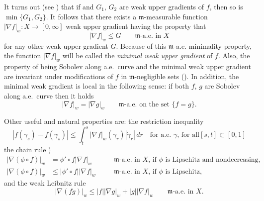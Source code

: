 \documentclass[reqno,11pt]{article}
\numberwithin{equation}{section}
\newcommand{\mm}{{\mbox{\boldmath$m$}}}
\newcommand{\weakgrad}[1]{|\nabla #1|_w}                %
\renewcommand{\mm}{\mathfrak m}
\begin{document}
It turns out (see \cite[Proposition~5.7,
Definition~5.9]{Ambrosio-Gigli-Savare11}) that if and $G_1,\,G_2$
are weak upper gradients of $f$, then so is $\min\{G_1,G_2\}$. It
follows that there exists a $\mm$-measurable function $\weakgrad
f:X\to[0,\infty]$ weak upper gradient having the property that
\[
\weakgrad f\leq G\qquad\text{$\mm$-a.e.~in $X$}
\]
for any other weak upper gradient $G$. Because of this $\mm$-a.e.
minimality property, the function $\weakgrad f$ will be called the
\emph{minimal weak upper gradient} of $f$. Also, the property of
being Sobolev along a.e.~curve and the minimal weak upper gradient
are invariant under modifications of $f$ in $\mm$-negligible sets
(\cite[Proposition~5.8]{Ambrosio-Gigli-Savare11}). In addition, the
minimal weak gradient is local in the following sense: if both
$f,\,g$ are Sobolev along a.e.~curve then it holds
\begin{equation}
\label{eq:weaklocal} \weakgrad f=\weakgrad g\qquad\text{$\mm$-a.e.
on the set $\{f=g\}$.}
\end{equation}

Other useful and natural properties are: the restriction inequality
\cite[Remark~5.6]{Ambrosio-Gigli-Savare11}
\begin{equation}
\label{eq:restrizione}
|f(\gamma_s)-f(\gamma_s)|\leq\int_t^s\weakgrad
f(\gamma_r)|\dot\gamma_r|\,dr\quad\text{for a.e.\ $\gamma$, for all
$[s,t]\subset [0,1]$}
\end{equation}
the chain rule \cite[Proposition~5.14(b)]{Ambrosio-Gigli-Savare11})
\begin{equation}
\label{eq:chainrule}
\begin{aligned}
\weakgrad{(\phi\circ f)}&=\phi'\circ f\weakgrad
f&\quad&\text{$\mm$-a.e.~in $X$, if $\phi$ is Lipschitz and nondecreasing,}\\
\weakgrad{(\phi\circ f)}&\leq |\phi'\circ f|\weakgrad
f&\quad&\text{$\mm$-a.e.~in $X$, if $\phi$ is Lipschitz,}
\end{aligned}
\end{equation}
and the weak Leibnitz rule
\begin{equation} \label{eq:weakleib}
\weakgrad{(fg)}\leq|f|\weakgrad g+|g|\weakgrad
f\qquad\text{$\mm$-a.e.~in $X$.}
\end{equation}
\end{document}
